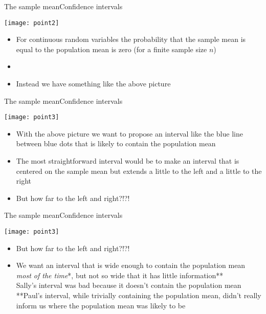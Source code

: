 \documentclass[xcolor=dvipsnames]{beamer}
\begin{document}
\begin{frame}{The sample mean}{Confidence intervals}
	\begin{center}
		\texttt{[image: point2]}
	\end{center}
	\begin{itemize}
		\item For continuous random variables the probability that the sample mean is equal to the population mean is zero (for a finite sample size $n$)
		\item[]
		\item Instead we have something like the above picture
	\end{itemize}
\end{frame}

\begin{frame}{The sample mean}{Confidence intervals}
	\begin{center}
		\texttt{[image: point3]}
	\end{center}
	\begin{itemize}
		\item With the above picture we want to propose an interval like the blue line between blue dots that is likely to contain the population mean \pause 
		\item The most straightforward interval would be to make an interval that is centered on the sample mean but extends a little to the left and a little to the right \pause 
		\item But how far to the left and right?!?!
	\end{itemize}
\end{frame}

\begin{frame}{The sample mean}{Confidence intervals}
	\begin{center}
		\texttt{[image: point3]}
	\end{center}
	\begin{itemize}
		\item But how far to the left and right?!?!
		\item We want an interval that is wide enough to contain the population mean \emph{most of the time}*, but not so wide that it has little information** \\
		\vspace{2.5pt}
		{\tiny *Sally's interval was bad because it doesn't contain the population mean
			**Paul's interval, while trivially containing the population mean, didn't really inform us where the population mean was likely to be}
	\end{itemize}
\end{frame}
\end{document}
